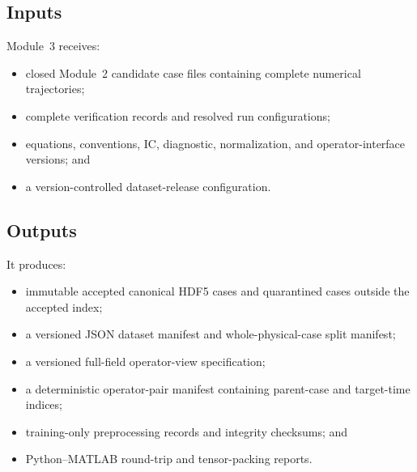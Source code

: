 \documentclass[11pt]{article}
\begin{document}
\subsection{Inputs}
Module~3 receives:
\begin{itemize}
  \item closed Module~2 candidate case files containing complete numerical trajectories;
  \item complete verification records and resolved run configurations;
  \item equations, conventions, IC, diagnostic, normalization, and operator-interface versions; and
  \item a version-controlled dataset-release configuration.
\end{itemize}

\subsection{Outputs}
It produces:
\begin{itemize}
  \item immutable accepted canonical HDF5 cases and quarantined cases outside the accepted index;
  \item a versioned JSON dataset manifest and whole-physical-case split manifest;
  \item a versioned full-field operator-view specification;
  \item a deterministic operator-pair manifest containing parent-case and target-time indices;
  \item training-only preprocessing records and integrity checksums; and
  \item Python--MATLAB round-trip and tensor-packing reports.
\end{itemize}
\end{document}
